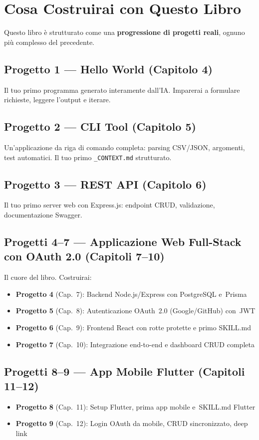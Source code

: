 \section{Cosa Costruirai con Questo Libro}

Questo libro è strutturato come una \textbf{progressione di progetti reali}, ognuno più complesso del precedente.

\subsection*{Progetto 1 --- Hello World (Capitolo 4)}
Il tuo primo programma generato interamente dall'IA. Imparerai a formulare richieste, leggere l'output e iterare.

\subsection*{Progetto 2 --- CLI Tool (Capitolo 5)}
Un'applicazione da riga di comando completa: parsing CSV/JSON, argomenti, test automatici. Il tuo primo \texttt{\_CONTEXT.md} strutturato.

\subsection*{Progetto 3 --- REST API (Capitolo 6)}
Il tuo primo server web con Express.js: endpoint CRUD, validazione, documentazione Swagger.

\subsection*{Progetti 4--7 --- Applicazione Web Full-Stack con OAuth 2.0 (Capitoli 7--10)}
Il cuore del libro. Costruirai:
\begin{itemize}
  \item \textbf{Progetto 4} (Cap.~7): Backend Node.js/Express con PostgreSQL e~Prisma
  \item \textbf{Progetto 5} (Cap.~8): Autenticazione OAuth~2.0 (Google/GitHub) con~JWT
  \item \textbf{Progetto 6} (Cap.~9): Frontend React con rotte protette e primo SKILL.md
  \item \textbf{Progetto 7} (Cap.~10): Integrazione end-to-end e dashboard CRUD completa
\end{itemize}

\subsection*{Progetti 8--9 --- App Mobile Flutter (Capitoli 11--12)}
\begin{itemize}
  \item \textbf{Progetto 8} (Cap.~11): Setup Flutter, prima app mobile e~SKILL.md Flutter
  \item \textbf{Progetto 9} (Cap.~12): Login OAuth da mobile, CRUD sincronizzato, deep link
\end{itemize}

